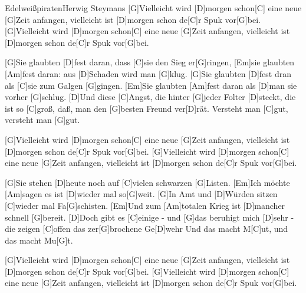 \documentclass[../main.tex]{subfiles}
\begin{document}
\begin{song}{Edelweißpiraten}{Herwig Steymans}
[G]Vielleicht wird [D]morgen schon[C] eine neue [G]Zeit anfangen,
vielleicht ist [D]morgen schon de[C]r Spuk vor[G]bei.
[G]Vielleicht wird [D]morgen schon[C] eine neue [G]Zeit anfangen,
vielleicht ist [D]morgen schon de[C]r Spuk vor[G]bei.

[G]Sie glaubten [D]fest daran, dass [C]sie den Sieg er[G]ringen,
[Em]sie glaubten [Am]fest daran: aus [D]Schaden wird man [G]klug.
[G]Sie glaubten [D]fest dran als [C]sie zum Galgen [G]gingen.
[Em]Sie glaubten [Am]fest daran als [D]man sie vorher [G]schlug.
[D]Und diese [C]Angst, die hinter [G]jeder Folter [D]steckt,
die ist so [C]groß, daß, man den [G]besten Freund ver[D]rät.
Versteht man [C]gut, versteht man [G]gut.

[G]Vielleicht wird [D]morgen schon[C] eine neue [G]Zeit anfangen,
vielleicht ist [D]morgen schon de[C]r Spuk vor[G]bei.
[G]Vielleicht wird [D]morgen schon[C] eine neue [G]Zeit anfangen,
vielleicht ist [D]morgen schon de[C]r Spuk vor[G]bei.

[G]Sie stehen [D]heute noch auf [C]vielen schwarzen [G]Listen.
[Em]Ich möchte [Am]sagen es ist [D]wieder mal so[G]weit.
[G]In Amt und [D]Würden sitzen [C]wieder mal Fa[G]schisten.
[Em]Und zum [Am]totalen Krieg ist [D]mancher schnell [G]bereit.
[D]Doch gibt es [C]einige - und [G]das beruhigt mich [D]sehr -
die zeigen [C]offen das zer[G]brochene Ge[D]wehr
Und das macht M[C]ut, und das macht Mu[G]t.

[G]Vielleicht wird [D]morgen schon[C] eine neue [G]Zeit anfangen,
vielleicht ist [D]morgen schon de[C]r Spuk vor[G]bei.
[G]Vielleicht wird [D]morgen schon[C] eine neue [G]Zeit anfangen,
vielleicht ist [D]morgen schon de[C]r Spuk vor[G]bei.

\end{song}
\end{document}
